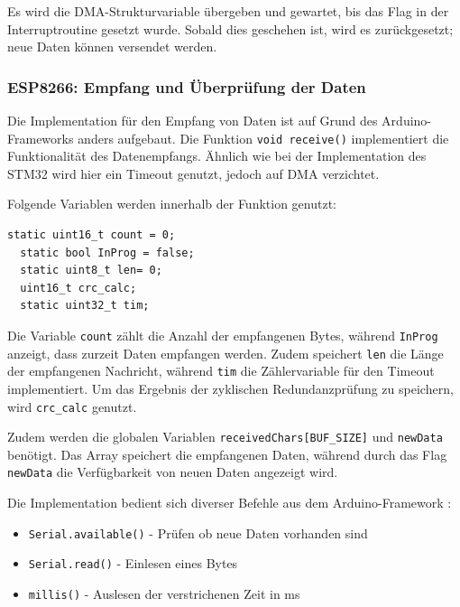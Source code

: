 Es wird die DMA-Strukturvariable übergeben und gewartet, bis das Flag in der Interruptroutine gesetzt wurde. Sobald dies geschehen ist, wird es zurückgesetzt;
neue Daten können versendet werden.



\subsubsection{ESP8266: Empfang und Überprüfung der Daten}
\label{subsub:Empfang8266}

Die Implementation für den Empfang von Daten ist auf Grund des Arduino-Frameworks \citep{ArduinoRef} anders aufgebaut. Die Funktion \lstinline!void receive()!
implementiert die Funktionalität des Datenempfangs. Ähnlich wie bei der Implementation des STM32 wird hier ein Timeout genutzt, jedoch auf \ac{DMA} verzichtet.

\smallskip

Folgende Variablen werden innerhalb der Funktion genutzt:

\begin{lstlisting}[caption={\textit{Variablen receive()}}]
  static uint16_t count = 0;
  static bool InProg = false;
  static uint8_t len= 0;
  uint16_t crc_calc;
  static uint32_t tim;  
\end{lstlisting}

Die Variable \lstinline!count! zählt die Anzahl der empfangenen Bytes, während \lstinline!InProg! anzeigt, dass zurzeit Daten empfangen werden. Zudem speichert
\lstinline!len! die Länge der empfangenen Nachricht, während \lstinline!tim! die Zählervariable für den Timeout implementiert. Um das Ergebnis der zyklischen
Redundanzprüfung zu speichern, wird \lstinline!crc_calc! genutzt.

\smallskip

Zudem werden die globalen Variablen \lstinline!receivedChars[BUF_SIZE]! und \lstinline!newData! benötigt.
Das Array speichert die empfangenen Daten, während durch das Flag \lstinline!newData! die Verfügbarkeit von neuen Daten angezeigt wird.

\smallskip

Die Implementation bedient sich diverser Befehle aus dem Arduino-Framework \citep{ArduinoRef}:

\begin{itemize}
  \item \lstinline!Serial.available()! - Prüfen ob neue Daten vorhanden sind
  \item \lstinline!Serial.read()! - Einlesen eines Bytes 
  \item \lstinline!millis()! - Auslesen der verstrichenen Zeit in ms
\end{itemize}

